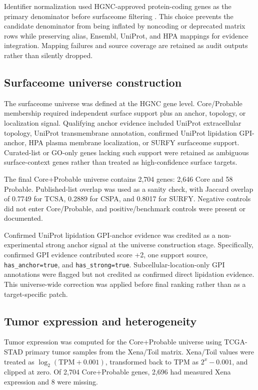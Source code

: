 \documentclass[preprint,12pt,authoryear]{elsarticle}
\begin{document}
Identifier normalization used HGNC-approved protein-coding genes as the primary denominator before surfaceome filtering \citep{tweedie2021hgnc}. This choice prevents the candidate denominator from being inflated by noncoding or deprecated matrix rows while preserving alias, Ensembl, UniProt, and HPA mappings for evidence integration. Mapping failures and source coverage are retained as audit outputs rather than silently dropped.

\subsection{Surfaceome universe construction}

The surfaceome universe was defined at the HGNC gene level. Core/\allowbreak{}Probable membership required independent surface support plus an anchor, topology, or localization signal. Qualifying anchor evidence included UniProt extracellular topology, UniProt transmembrane annotation, confirmed UniProt lipidation GPI-anchor, HPA plasma membrane localization, or SURFY surfaceome support. Curated-list or GO-only genes lacking such support were retained as ambiguous surface-context genes rather than treated as high-confidence surface targets.

The final Core+\allowbreak{}Probable universe contains 2,704 genes: 2,646 Core and 58 Probable. Published-list overlap was used as a sanity check, with Jaccard overlap of 0.7749 for TCSA, 0.2889 for CSPA, and 0.8017 for SURFY. Negative controls did not enter Core/\allowbreak{}Probable, and positive/\allowbreak{}benchmark controls were present or documented.

Confirmed UniProt lipidation GPI-anchor evidence was credited as a non-experimental strong anchor signal at the universe construction stage. Specifically, confirmed GPI evidence contributed score +\allowbreak{}2, one support source, \texttt{has\_\allowbreak{}anchor=true}, and \texttt{has\_\allowbreak{}strong=true}. Subcellular-location-only GPI annotations were flagged but not credited as confirmed direct lipidation evidence. This universe-wide correction was applied before final ranking rather than as a target-specific patch.

\subsection{Tumor expression and heterogeneity}

Tumor expression was computed for the Core+\allowbreak{}Probable universe using TCGA-STAD primary tumor samples from the Xena/\allowbreak{}Toil matrix. Xena/\allowbreak{}Toil values were treated as $\log_2(\mathrm{TPM}+0.001)$, transformed back to TPM as $2^{x} - 0.001$, and clipped at zero. Of 2,704 Core+\allowbreak{}Probable genes, 2,696 had measured Xena expression and 8 were missing.
\end{document}
